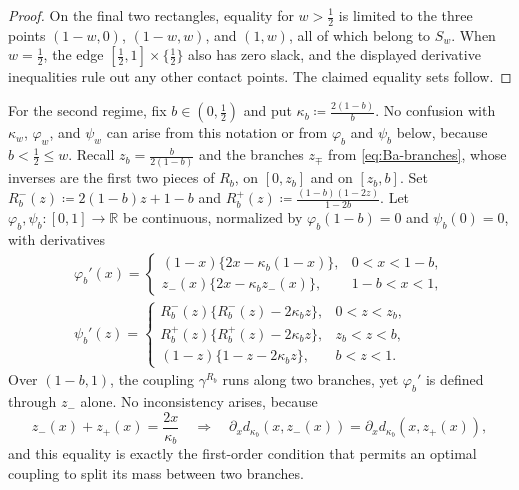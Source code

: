 \documentclass[11pt,a4paper]{article}
\theoremstyle{remark}
\newcommand{\R}{\mathbb{R}}
\newcommand{\1}{\mathbf{1}}
\begin{document}
\begin{proof}
On the final two rectangles, equality for $w>\frac12$ is limited to the three points $(1-w,0)$, $(1-w,w)$, and $(1,w)$, all of which belong to $S_w$.
When $w=\frac12$, the edge $[\frac12,1]\times\{\frac12\}$ also has zero slack, and the displayed derivative inequalities rule out any other contact points.
The claimed equality sets follow.
\end{proof}

For the second regime, fix $b\in(0,\frac12)$ and put $\kappa_b\coloneqq\frac{2(1-b)}{b}$.
No confusion with $\kappa_w$, $\varphi_w$, and $\psi_w$ can arise from this notation or from $\varphi_b$ and $\psi_b$ below, because $b<\frac12\le w$.
Recall $z_b=\frac{b}{2(1-b)}$ and the branches $z_\mp$ from \eqref{eq:Ba-branches}, whose inverses are the first two pieces of $R_b$, on $[0,z_b]$ and on $[z_b,b]$.
Set $R_b^-(z)\coloneqq2(1-b)z+1-b$ and $R_b^+(z)\coloneqq\frac{(1-b)(1-2z)}{1-2b}$.
Let $\varphi_b,\psi_b:[0,1]\to\R$ be continuous, normalized by $\varphi_b(1-b)=0$ and $\psi_b(0)=0$, with derivatives
\begin{equation}
  \label{eq:potential-B}
  \begin{gathered}
  \varphi_b'(x)=
  \begin{cases}
    (1-x)\bigl\{2x-\kappa_b(1-x)\bigr\}, & 0<x<1-b,\\[0.3ex]
    z_-(x)\bigl\{2x-\kappa_bz_-(x)\bigr\}, & 1-b<x<1,
  \end{cases}\\[0.5ex]
  \psi_b'(z)=
  \begin{cases}
    R_b^-(z)\bigl\{R_b^-(z)-2\kappa_bz\bigr\}, & 0<z<z_b,\\[0.3ex]
    R_b^+(z)\bigl\{R_b^+(z)-2\kappa_bz\bigr\}, & z_b<z<b,\\[0.3ex]
    (1-z)\bigl\{1-z-2\kappa_bz\bigr\}, & b<z<1.
  \end{cases}
  \end{gathered}
\end{equation}
Over $(1-b,1)$, the coupling $\gamma^{R_b}$ runs along two branches, yet $\varphi_b'$ is defined through $z_-$ alone.
No inconsistency arises, because
\begin{equation}
  \label{eq:branch-sum}
  z_-(x)+z_+(x)=\frac{2x}{\kappa_b}
  \quad\Longrightarrow\quad
  \partial_xd_{\kappa_b}(x,z_-(x))=\partial_xd_{\kappa_b}(x,z_+(x)),
\end{equation}
and this equality is exactly the first-order condition that permits an optimal coupling to split its mass between two branches.
\end{document}
